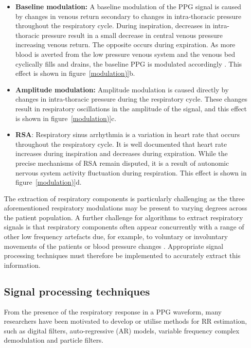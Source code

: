 \begin{itemize}
	\item \textbf{Baseline modulation:} A baseline modulation of the PPG signal is caused by changes in venous return secondary to changes in intra-thoracic pressure throughout the respiratory cycle. During inspiration, decreases in intra-thoracic pressure result in a small decrease in central venous pressure increasing venous return. The opposite occurs during expiration. As more blood is averted from the low pressure venous system and the venous bed cyclically fills and drains, the baseline PPG is modulated accordingly \cite{addison2012developing}. This effect is shown in figure~\ref{modulation)}b.
	
	\item \textbf{Amplitude modulation:} Amplitude modulation is caused directly by changes in intra-thoracic pressure during the respiratory cycle. These changes result in respiratory oscillations in the amplitude of the signal, and this effect is shown in figure~\ref{modulation)}c.
	
	\item \textbf{RSA}: Respiratory sinus arrhythmia is a variation in heart rate that occurs throughout the respiratory cycle. It is well documented that heart rate increases during inspiration and decreases during expiration. While the precise mechanisms of RSA remain disputed, it is a result of autonomic nervous system activity fluctuation during respiration. This effect is shown in figure~\ref{modulation)}d.

\end{itemize}
The extraction of respiratory components is particularly challenging as the three aforementioned respiratory modulations may be present to varying degrees across the patient population. A further challenge for algorithms to extract respiratory signals is that respiratory components often appear concurrently with a range of other low frequency artefacts due, for example, to voluntary or involuntary movements of the patients or blood pressure changes \cite{addison2012developing}. Appropriate signal processing techniques must therefore be implemented to accurately extract this information.

\subsection{Signal processing techniques }

From the presence of the respiratory response in a PPG waveform, many researchers have been motivated to develop or utilise methods for RR estimation, such as digital filters, auto-regressive (AR) models, variable frequency complex demodulation and particle filters.

